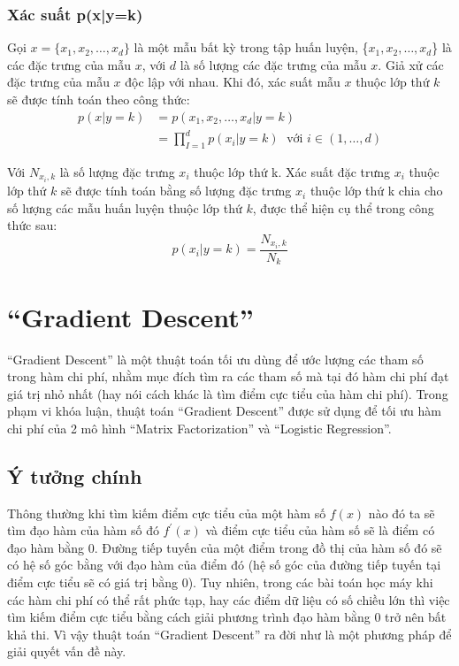 \subsubsection{Xác suất p(x|y=k)}
Gọi $x = \{x_1, x_2, \dots, x_d\}$ là một mẫu bất kỳ trong tập huấn luyện, \{$x_1, x_2, \dots, x_d$\} là các đặc trưng của mẫu $x$, với $d$ là số lượng các đặc trưng của mẫu $x$. Giả xử các đặc trưng của mẫu $x$ độc lập với nhau. Khi đó, xác suất mẫu $x$ thuộc lớp thứ $k$ sẽ được tính toán theo công thức:
\begin{equation}
    \label{eq:2.3_p(x|y)}
    \begin{split}
        p(x|y=k) &= p(x_1, x_2, \dots, x_d|y=k)\\
        &= \prod_{I=1}^{d} p(x_i|y=k) \; \text{ với } i \in (1,\dots,d)
    \end{split}
\end{equation}

Với $N_{x_i, k}$ là số lượng đặc trưng $x_i$ thuộc lớp thứ k. Xác suất đặc trưng $x_i$ thuộc lớp thứ $k$ sẽ được tính toán bằng số lượng đặc trưng $x_i$ thuộc lớp thứ k chia cho số lượng các mẫu huấn luyện thuộc lớp thứ $k$, được thể hiện cụ thể trong công thức sau:
\begin{equation}
    p(x_i|y=k) = \frac{N_{x_i, k}}{N_k}
\end{equation}

\section{``Gradient Descent''}
\label{section:Gradientdescent}
``Gradient Descent'' là một thuật toán tối ưu dùng để ước lượng các tham số trong hàm chi phí, nhằm mục đích tìm ra các tham số mà tại đó hàm chi phí đạt giá trị nhỏ nhất (hay nói cách khác là tìm điểm cực tiểu của hàm chi phí). Trong phạm vi khóa luận, thuật toán ``Gradient Descent'' được sử dụng để tối ưu hàm chi phí của 2 mô hình ``Matrix Factorization'' và ``Logistic Regression''.
\subsection{Ý tưởng chính}
Thông thường khi tìm kiếm điểm cực tiểu của một hàm số $f(x)$ nào đó ta sẽ tìm đạo hàm của hàm số đó $f^{'}(x)$ và điểm cực tiểu của hàm số sẽ là điểm có đạo hàm bằng 0. Đường tiếp tuyến của một điểm trong đồ thị của hàm số đó sẽ có hệ số góc bằng với đạo hàm của điểm đó (hệ số góc của đường tiếp tuyến tại điểm cực tiểu sẽ có giá trị bằng 0).
Tuy nhiên, trong các bài toán học máy khi các hàm chi phí có thể rất phức tạp, hay các điểm dữ liệu có số chiều lớn thì việc tìm kiếm điểm cực tiểu bằng cách giải phương trình đạo hàm bằng 0 trở nên bất khả thi. Vì vậy thuật toán ``Gradient Descent'' ra đời như là một phương pháp để giải quyết vấn đề này.

